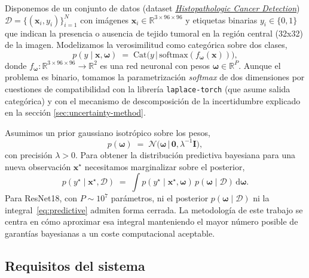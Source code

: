 \documentclass{article}
\begin{document}
Disponemos de un conjunto de datos (dataset \href{https://www.kaggle.com/c/histopathologic-cancer-detection}{\emph{Histopathologic Cancer Detection}})
$\mathcal{D}=\{(\mathbf{x}_{i},y_{i})\}_{i=1}^{N}$
con im\'agenes $\mathbf{x}_{i}\in\mathbb{R}^{3\times 96\times 96}$ y
etiquetas binarias $y_{i}\in\{0,1\}$ que indican la presencia o
ausencia de tejido tumoral en la región central (32x32) de la imagen. 
Modelizamos la verosimilitud como
categ\'orica sobre dos clases,
\begin{equation}
  p(y\mid\mathbf{x},\boldsymbol{\omega})
  \;=\;
  \mathrm{Cat}\!\bigl(y\,\big|\,
     \mathrm{softmax}(f_{\boldsymbol{\omega}}(\mathbf{x}))\bigr),
  \label{eq:lik}
\end{equation}
donde $f_{\boldsymbol{\omega}}:\mathbb{R}^{3\times 96\times 96}\to\mathbb{R}^{2}$
es una red neuronal con pesos $\boldsymbol{\omega}\in\mathbb{R}^{P}$.
Aunque el problema es binario, tomamos la parametrizaci\'on \textit{softmax}
de dos dimensiones por cuestiones de compatibilidad con la librer\'ia
\texttt{laplace-torch} (que asume salida categ\'orica) y con el mecanismo de 
descomposición de la incertidumbre explicado en la sección \ref{sec:uncertainty-method}.
 
Asumimos un prior gaussiano isotr\'opico sobre los pesos,
\begin{equation}
  p(\boldsymbol{\omega})
  \;=\;
  \mathcal{N}\!\bigl(\boldsymbol{\omega}\,\big|\,\mathbf{0},\lambda^{-1}\mathbf{I}\bigr),
  \label{eq:prior}
\end{equation}
con precisi\'on $\lambda>0$. %
Para obtener la distribución predictiva bayesiana para una nueva observación $\mathbf{x}^{\star}$ necesitamos 
marginalizar sobre el posterior,
\begin{equation}
  p(y^{\star}\mid\mathbf{x}^{\star},\mathcal{D})
  \;=\;
  \int p(y^{\star}\mid\mathbf{x}^{\star},\boldsymbol{\omega})\,
       p(\boldsymbol{\omega}\mid\mathcal{D})\,
       \mathrm{d}\boldsymbol{\omega}.
  \label{eq:predictive}
\end{equation}
Para ResNet18, con $P\!\sim\!10^{7}$ par\'ametros, ni el posterior
$p(\boldsymbol{\omega}\mid\mathcal{D})$ ni la integral~\eqref{eq:predictive}
admiten forma cerrada. La metodolog\'ia de este trabajo se centra
en c\'omo aproximar esa integral manteniendo el mayor n\'umero posible
de garant\'ias bayesianas a un coste computacional aceptable.

\subsection{Requisitos del sistema}
\label{sec:requirements}
\end{document}
